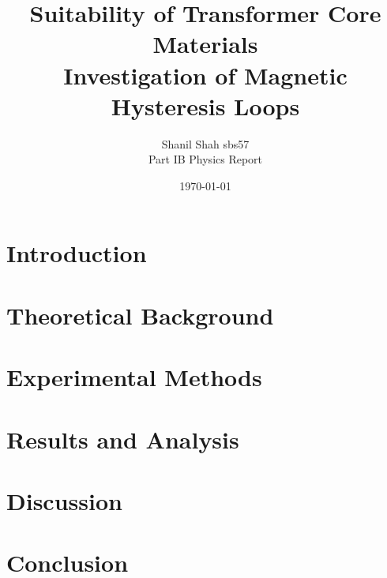 \documentclass[11pt,a4paper]{article}
\title{\vspace*{-4em}Suitability of Transformer Core Materials \\ \large{Investigation of Magnetic Hysteresis Loops}}
\author{Shanil Shah sbs57 \\ Part IB Physics Report}
\date{\today}
\numberwithin{equation}{section}
\begin{document}
\maketitle

\begin{abstract}
	
\end{abstract}

\section{Introduction}


\section{Theoretical Background}


\section{Experimental Methods}


\section{Results and Analysis} \label{analysis}



\section{Discussion}\label{sec:discussion}


\section{Conclusion}




\end{document}
